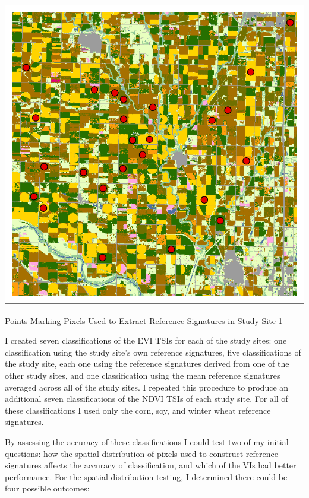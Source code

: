 \begin{ssfigure}
  \centering
  \includegraphics[width=.7\textwidth]{Graphics/Testing/clip1_30mCDL_smpl_old.pdf}
  \caption{Points Marking Pixels Used to Extract Reference Signatures in Study Site 1}
  \label{fig:refpoints}
\end{ssfigure}

I created seven classifications of the EVI TSIs for each of the study sites: one classification using the study site's own reference signatures, five classifications of the study site, each one using the reference signatures derived from one of the other study sites, and one classification using the mean reference signatures averaged across all of the study sites. I repeated this procedure to produce an additional seven classifications of the NDVI TSIs of each study site. For all of these classifications I used only the corn, soy, and winter wheat reference signatures.

By assessing the accuracy of these classifications I could test two of my initial questions: how the spatial distribution of pixels used to construct reference signatures affects the accuracy of classification, and which of the VIs had better performance. For the spatial distribution testing, I determined there could be four possible outcomes:

